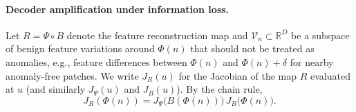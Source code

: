 \documentclass{article}
\theoremstyle{plain}
\theoremstyle{definition}
\theoremstyle{remark}
\begin{document}



\paragraph{Decoder amplification under information loss.}
Let $R = \Psi \circ B$ denote the feature reconstruction map and $\mathcal{V}_n \subset \mathbb{R}^D$ be a subspace of benign feature
variations around $\Phi(n)$ that should not be treated as anomalies, e.g.,
feature differences between $\Phi(n)$ and $\Phi(n)+\delta$ for nearby
anomaly-free patches.
We write $J_R(u)$ for the Jacobian of the map $R$ evaluated at $u$ (and similarly
$J_\Psi(u)$ and $J_B(u)$).
By the chain rule,
\begin{equation}
    J_R(\Phi(n)) = J_\Psi\big(B(\Phi(n))\big)\, J_B\big(\Phi(n)\big).
\label{eq:chainrule}
\end{equation}
\end{document}
